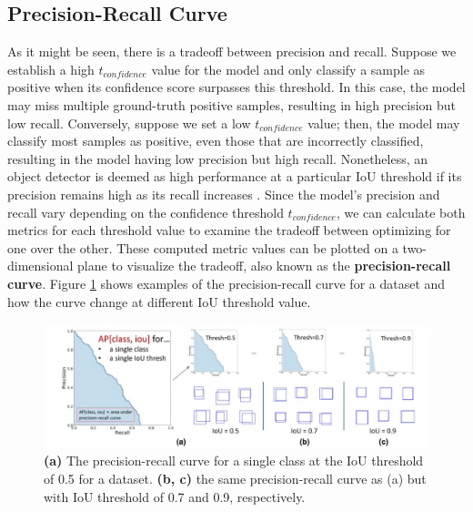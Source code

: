 \subsection{Precision-Recall Curve}  \label{subsec:pr_curve}
As it might be seen, there is a tradeoff between precision and recall. Suppose we establish a high $t_{confidence}$ value for the model and only classify a sample as positive when its confidence score surpasses this threshold. In this case, the model may miss multiple ground-truth positive samples, resulting in high precision but low recall. Conversely, suppose we set a low $t_{confidence}$ value; then, the model may classify most samples as positive, even those that are incorrectly classified, resulting in the model having low precision but high recall. Nonetheless, an object detector is deemed as high performance at a particular IoU threshold if its precision remains high as its recall increases \cite{metrics_survey_2020}. Since the model's precision and recall vary depending on the confidence threshold $t_{confidence}$, we can calculate both metrics for each threshold value to examine the tradeoff between optimizing for one over the other. These computed metric values can be plotted on a two-dimensional plane to visualize the tradeoff, also known as the \textbf{precision-recall curve}. Figure \ref{fig:precision-recall_curve} shows examples of the precision-recall curve for a dataset and how the curve change at different IoU threshold value.

\begin{figure}[!ht]
    \centering
    \includegraphics[width=5.5in]{figures/precision_recall_curve.png}
    \caption{\textbf{(a)} The precision-recall curve for a single class at the IoU threshold of 0.5 for a dataset. \textbf{(b, c)} the same precision-recall curve as (a) but with IoU threshold of 0.7 and 0.9, respectively. \cite{szeliski_cv_book}} 
    \label{fig:precision-recall_curve}
\end{figure}

